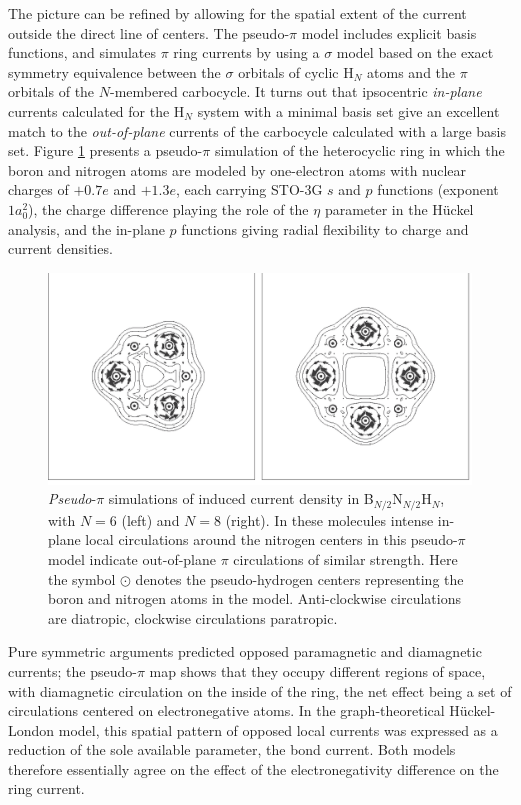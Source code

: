 The picture can be refined by allowing for the spatial extent of the current outside the direct line of centers. The pseudo-$\pi$
model \cite{r24} includes explicit basis functions, and simulates $\pi$ ring currents by using a $\sigma$ model based on
the exact symmetry equivalence between the $\sigma$ orbitals of cyclic H$_N$ atoms and the $\pi$ orbitals of the
$N$-membered carbocycle. It turns out that ipsocentric \textit{in-plane} currents calculated for the H$_N$ system with
a minimal basis set give an excellent match to the \textit{out-of-plane} currents of the carbocycle calculated with a large
basis set. Figure \ref{ch5.fig.f03} presents a pseudo-$\pi$ simulation of the heterocyclic ring in which the boron and nitrogen
atoms are modeled by one-electron atoms with nuclear charges of $+0.7e$ and $+1.3e$, each carrying STO-3G $s$ and $p$
functions (exponent $1a_{0}^{2}$), the charge difference playing the role of the $\eta$ parameter in the H\"uckel analysis,
and the in-plane $p$ functions giving radial flexibility to charge and current densities. 
\begin{figure}[htdp]
\begin{center}
\includegraphics{huckel/figures/fig3.eps}
\end{center}
\caption{\textit{Pseudo}-$\pi$ simulations of induced current density in B$_{N/2}$N$_{N/2}$H$_N$, with $N=6$ (left) and 
$N=8$ (right). In these molecules intense in-plane local circulations around the nitrogen centers in this pseudo-$\pi$ model
indicate out-of-plane $\pi$ circulations of similar strength. Here the symbol $\odot$ denotes the pseudo-hydrogen centers
representing the boron and nitrogen atoms in the model. Anti-clockwise circulations are diatropic, clockwise circulations
paratropic.}
\label{ch5.fig.f03}
\end{figure}
Pure symmetric arguments predicted
opposed paramagnetic and diamagnetic currents; the pseudo-$\pi$ map shows that they occupy different regions of space,
with diamagnetic circulation on the inside of the ring, the net effect being a set of circulations centered on electronegative atoms.
In the graph-theoretical H\"uckel-London model, this spatial pattern of opposed local currents was expressed as a reduction
of the sole available parameter, the bond current. Both models therefore essentially agree on the effect of the electronegativity
difference on the ring current.

